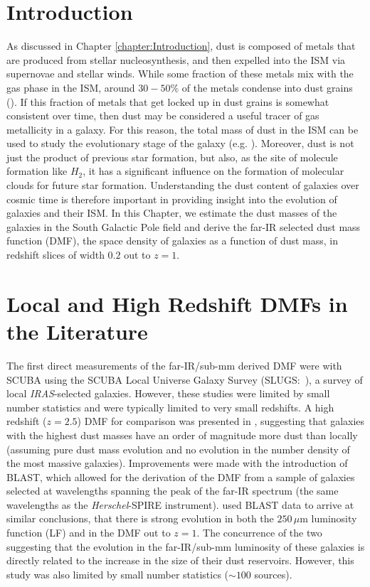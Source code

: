 \sloppy

\section{Introduction}

As discussed in Chapter \ref{chapter:Introduction}, dust is composed of metals that are produced from stellar nucleosynthesis, and then expelled into the ISM via supernovae and stellar winds. While some fraction of these metals mix with the gas phase in the ISM, around $30 - 50\%$ of the metals condense into dust grains (\citealt{Draine_2007b}). If this fraction of metals that get locked up in dust grains is somewhat consistent over time, then dust may be considered a useful tracer of gas metallicity in a galaxy. For this reason, the total mass of dust in the ISM can be used to study the evolutionary stage of the galaxy (e.g. \citealt{Cortese_2012, deVis_2017a, deVis_2017b}). Moreover, dust is not just the product of previous star formation, but also, as the site of molecule formation like $H_2$, it has a significant influence on the formation of molecular clouds for future star formation. Understanding the dust content of galaxies over cosmic time is therefore important in providing insight into the evolution of galaxies and their ISM. In this Chapter, we estimate the dust masses of the galaxies in the South Galactic Pole field and derive the far-IR selected dust mass function (DMF), the space density of galaxies as a function of dust mass, in redshift slices of width $0.2$ out to $z = 1$.

\section{Local and High Redshift DMFs in the Literature}

The first direct measurements of the far-IR/sub-mm derived DMF were with SCUBA using the SCUBA Local Universe Galaxy Survey \mbox{(SLUGS: \citealt{Dunne_2000, Dunne_2001, Vlahakis_2005})}, a survey of local \textit{IRAS}-selected galaxies. However, these studies were limited by small number statistics and were typically limited to very small redshifts. A high redshift ($z = 2.5$) DMF for comparison was presented in \citealt{Dunne_2003}, suggesting that galaxies with the highest dust masses have an order of magnitude more dust than locally (assuming pure dust mass evolution and no evolution in the number density of the most massive galaxies). Improvements were made with the introduction of BLAST, which allowed for the derivation of the DMF from a sample of galaxies selected at wavelengths spanning the peak of the far-IR spectrum (the same wavelengths as the \textit{Herschel}-SPIRE instrument). \citealt{Eales_2009} used BLAST data to arrive at similar conclusions, that there is strong evolution in both the $250\,\mu$m luminosity function (LF) and in the DMF out to $z = 1$. The concurrence of the two suggesting that the evolution in the far-IR/sub-mm luminosity of these galaxies is directly related to the increase in the size of their dust reservoirs. However, this study was also limited by small number statistics ($\sim 100$ sources).

